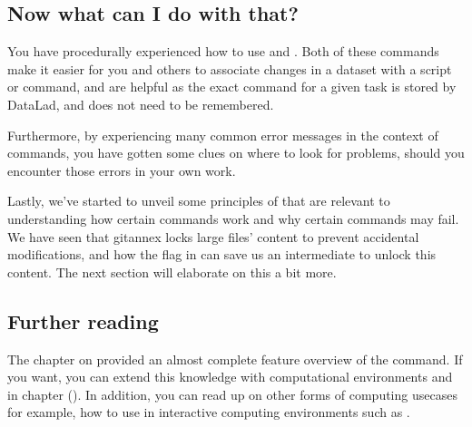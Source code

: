 \subsection{Now what can I do with that?}
\label{\detokenize{basics/101-113-summary:now-what-can-i-do-with-that}}
\sphinxAtStartPar
You have procedurally experienced how to use  and . Both
of these commands make it easier for you and others to associate changes in a dataset with
a script or command, and are helpful as the exact command for a given task is stored by
DataLad, and does not need to be remembered.

\sphinxAtStartPar
Furthermore, by experiencing many common error messages in the context of 
commands, you have gotten some clues on where to look for problems, should you encounter
those errors in your own work.

\sphinxAtStartPar
Lastly, we’ve started to unveil some principles of {\hyperref[\detokenize{glossary:term-git-annex}]{}} that are relevant to
understanding how certain commands work and why certain commands may fail. We have seen that
git\sphinxhyphen{}annex locks large files’ content to prevent accidental modifications, and how the 
flag in  can save us an intermediate  to unlock this content.
The next section will elaborate on this a bit more.


\subsection{Further reading}
\label{\detokenize{basics/101-113-summary:further-reading}}
\sphinxAtStartPar
The chapter on  provided an almost complete feature overview of the command.
If you want, you can extend this knowledge with computational environments and  in chapter {\hyperref[\detokenize{basics/101-133-containersrun:containersrun}]{}} ().
In addition, you can read up on other forms of computing usecases \sphinxhyphen{} for example, how to use  in interactive computing environments such as .

\sphinxstepscope


